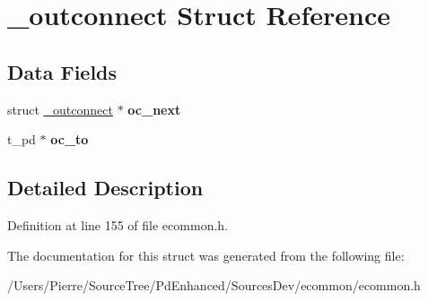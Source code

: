 \hypertarget{struct__outconnect}{\section{\-\_\-outconnect Struct Reference}
\label{struct__outconnect}
}
\subsection*{Data Fields}
\begin{DoxyCompactItemize}
\item 
\hypertarget{struct__outconnect_adbea08b41c0c8fe91283ea49fc0d4cfc}{struct \hyperlink{struct__outconnect}{\-\_\-outconnect} $\ast$ {\bfseries oc\-\_\-next}}\label{struct__outconnect_adbea08b41c0c8fe91283ea49fc0d4cfc}

\item 
\hypertarget{struct__outconnect_a9883a86f4e61a89103c9b67a9b415385}{t\-\_\-pd $\ast$ {\bfseries oc\-\_\-to}}\label{struct__outconnect_a9883a86f4e61a89103c9b67a9b415385}

\end{DoxyCompactItemize}


\subsection{Detailed Description}


Definition at line 155 of file ecommon.\-h.



The documentation for this struct was generated from the following file\-:\begin{DoxyCompactItemize}
\item 
/\-Users/\-Pierre/\-Source\-Tree/\-Pd\-Enhanced/\-Sources\-Dev/ecommon/ecommon.\-h\end{DoxyCompactItemize}
